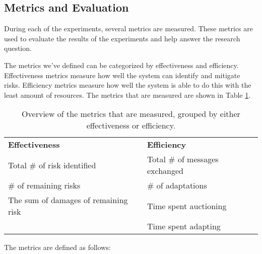 \subsection{Metrics and Evaluation}
\label{ssec:metrics}
During each of the experiments, several metrics are measured. These metrics are used to evaluate the results of the experiments and help answer the research question. 

The metrics we've defined can be categorized by effectiveness and efficiency. Effectiveness metrics measure how well the system can identify and mitigate risks. Efficiency metrics measure how well the system is able to do this with the least amount of resources. The metrics that are measured are shown in Table \ref{table:metrics-groups}.

\begin{table}[H]
    \centering
    \begin{tabular}{l|l}
        \textbf{Effectiveness}            & \textbf{Efficiency}            \\
        Total \# of risk identified       & Total \# of messages exchanged \\
        \# of remaining risks             & \# of adaptations              \\
        The sum of damages of remaining risk & Time spent auctioning  \\
                                          & Time spent adapting            \\
    \end{tabular}
    \caption{\label{table:metrics-groups}Overview of the metrics that are measured, grouped by either effectiveness or efficiency.}
\end{table}


The metrics are defined as follows:

